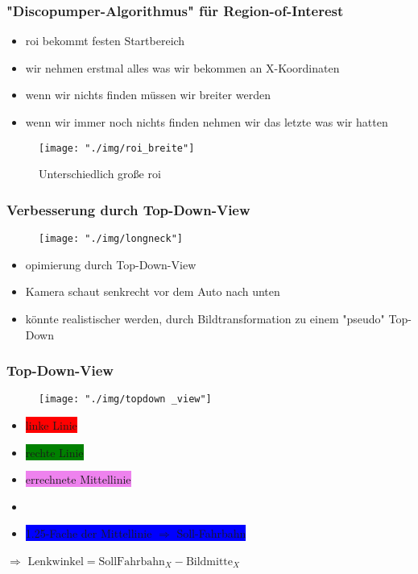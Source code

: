 \documentclass{beamer}
\begin{document}
	\begin{frame}
		\frametitle{"Discopumper-Algorithmus" für Region-of-Interest}
		\begin{itemize}
			\item roi bekommt festen Startbereich
			\item wir nehmen erstmal alles was wir bekommen an X-Koordinaten
			\item wenn wir nichts finden müssen wir breiter werden
			\item wenn wir immer noch nichts finden nehmen wir das letzte was wir hatten
		\end{itemize}

		\begin{center}
			\begin{figure}[h]
				\texttt{[image: "./img/roi\_breite"]}
				\label{fig:roi}
				\caption{Unterschiedlich große roi}
			\end{figure}
		\end{center}
	\end{frame}

	\begin{frame}
		\frametitle{Verbesserung durch Top-Down-View}
		\begin{center}
			\begin{figure}[h]
				\texttt{[image: "./img/longneck"]}
				\label{fig:longneck}
			\end{figure}
		\end{center}

	\begin{itemize}
		\item opimierung durch Top-Down-View
		\item Kamera schaut senkrecht vor dem Auto nach unten
		\item könnte realistischer werden, durch Bildtransformation zu einem "pseudo" Top-Down 
	\end{itemize}
	\end{frame}

	\begin{frame}
		\frametitle{Top-Down-View}
		\begin{center}
			\begin{figure}[h]
				\texttt{[image: "./img/topdown \_view"]}
				\label{fig:topdown}
			\end{figure}
		\end{center}

		\begin{itemize}
			\item \colorbox{red}{linke Linie}
			\item \colorbox{green}{rechte Linie}
			\item \colorbox{violet}{errechnete Mittellinie}
			\item \colorbox{white}{\color{black}{Bildmitte $	\Leftrightarrow$ Automitte}}
			\item \colorbox{blue}{1.25-Fache der Mittellinie $\Rightarrow$ Soll-Fahrbahn}
		\end{itemize}
	$\Rightarrow$ $\text{Lenkwinkel} = \text{SollFahrbahn}_X - \text{Bildmitte}_X$
	\end{frame}
	
\end{document}
